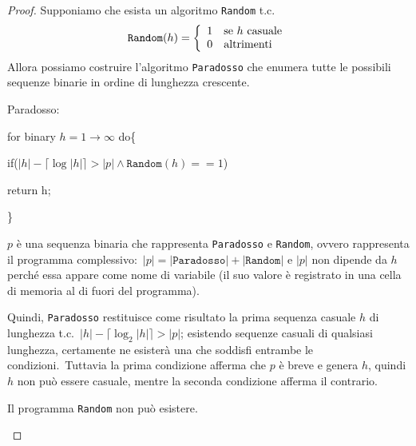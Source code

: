 \begin{proof}

    Supponiamo che esista un algoritmo \texttt{Random} t.c.\
    \[\mathtt{Random}(h) = \left\{\begin{array}{l l}
            1 & \mathrm{se}\ h\ \mathrm{casuale} \\
            0 & \mathrm{altrimenti}              \\
        \end{array}\right.\]
    Allora possiamo costruire l'algoritmo \texttt{Paradosso} che enumera tutte le possibili sequenze binarie in ordine di lunghezza crescente.\

    \begin{flushleft}
        \ttfamily
        Paradosso:

        \quad for binary $h= 1 \to\infty$ do\{

        \qquad if($|h| - \lceil \log|h|\rceil > |p| \land \mathtt{Random}(h) == 1$)

        \quad\qquad return h;

        \}
    \end{flushleft}

    \noindent $p$ è una sequenza binaria che rappresenta \texttt{Paradosso} e \texttt{Random}, ovvero rappresenta il programma complessivo:\ $|p| = |\mathtt{Paradosso}| + |\mathtt{Random}|$ e $|p|$ non dipende da $h$ perché essa appare come nome di variabile (il suo valore è registrato in una cella di memoria al di fuori del programma).\

    Quindi, \texttt{Paradosso} restituisce come risultato la prima sequenza casuale $h$ di lunghezza t.c.\ $|h| - \lceil \log_2|h|\rceil > |p|$; esistendo sequenze casuali di qualsiasi lunghezza, certamente ne esisterà una che soddisfi entrambe le condizioni.\
    Tuttavia la prima condizione afferma che $p$ è breve e genera $h$, quindi $h$ non può essere casuale, mentre la seconda condizione afferma il contrario.\
    \begin{center}
        Il programma \texttt{Random} non può esistere.\
    \end{center}

\end{proof}
